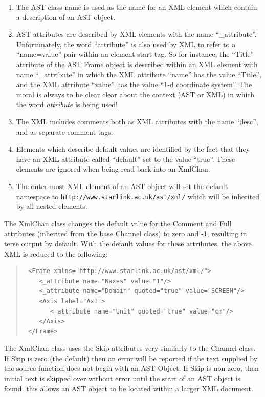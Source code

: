 \documentclass[twoside,11pt]{article}
\begin{document}
\begin{enumerate}
\item The AST class name is used as the name for an XML element which contain 
a description of an AST object.

\item AST attributes are described by XML elements with the name
``\_attribute''. Unfortunately, the word ``attribute'' is also used by XML
to refer to a ``name=value'' pair within an element start tag. So for
instance, the ``Title'' attribute of the AST Frame object is described
within an XML element with name ``\_attribute'' in which the XML attribute
``name'' has the value ``Title'', and the XML attribute ``value'' has the 
value ``1-d coordinate system''. The moral is always to be clear clear 
about the context (AST or XML) in which the word \emph{attribute} is being 
used!

\item The XML includes comments both as XML attributes with the name ``desc'', 
and as separate comment tags.

\item Elements which describe default values are identified by the fact
that they have an XML attribute called ``default'' set to the value
``true''. These elements are ignored when being read back into an XmlChan.

\item The outer-most XML element of an AST object will set the default
namespace to \verb+http://www.starlink.ac.uk/ast/xml/+ which will be
inherited by all nested elements.

\end{enumerate}


The XmlChan class changes the default value for the Comment and Full
attributes (inherited from the base Channel class) to zero and -1,
resulting in terse output by default. With the default values for these
attributes, the above XML is reduced to the following:

\begin{quote}
\small
\begin{verbatim}
 <Frame xmlns="http://www.starlink.ac.uk/ast/xml/">
    <_attribute name="Naxes" value="1"/>
    <_attribute name="Domain" quoted="true" value="SCREEN"/>
    <Axis label="Ax1">
       <_attribute name="Unit" quoted="true" value="cm"/>
    </Axis>
 </Frame>
\end{verbatim}
\normalsize
\end{quote}


The XmlChan class uses the Skip attributes very similarly to the Channel
class. If Skip is zero (the default) then an error will be reported if the text
supplied by the source function does not begin with an AST Object. If
Skip is non-zero, then initial text is skipped over without error until
the start of an AST object is found. this allows an AST object to be
located within a larger XML document.
\end{document}
